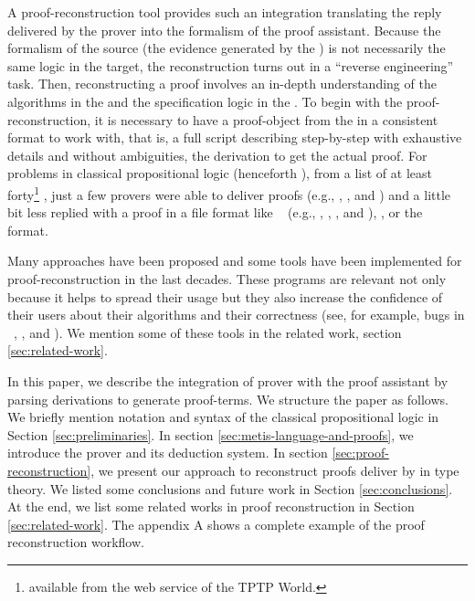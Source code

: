 \documentclass[../main.tex]{subfiles}
\begin{document}
A proof-reconstruction tool provides such an integration translating
the reply delivered by the prover into the formalism of the proof
assistant. Because the formalism of the source (the evidence
generated by the \ATP) is not necessarily the same logic in the
target, the reconstruction turns out in a ``reverse engineering''
task. Then, reconstructing a proof involves an in-depth
understanding of the algorithms in the \ATP and the specification
logic in the \ITP. To begin with the proof-reconstruction, it is
necessary to have a proof-object from the \ATP in a consistent
format to work with, that is, a full script describing step-by-step
with exhaustive details and without ambiguities, the derivation to
get the actual proof.
For problems in classical propositional logic (henceforth \CPL),
from a list of at least forty\footnote{\ATPs available from the web
service  of the TPTP World.} \ATPs, just a few
provers were able to deliver proofs (e.g., 
\cite{Barrett2011}, , and 
\cite{hillenbrand1997}) and a little bit less replied with a proof
in a file format like \TSTP~\cite{sutcliffe2004tstp} (e.g.,
, \Metis, , and ), 
\cite{Stump2008}, or the ~\cite{Bohme2011} format.

Many approaches have been proposed and some tools have been
implemented for proof-reconstruction in the last decades. These
programs are relevant not only because it helps to spread their
usage but they also increase the confidence of their users about
their algorithms and their correctness (see, for example, bugs in
\ATPs~\cite{Keller2013}, \cite{Bohme2011}, \cite{Fleury2014} and
\cite{Kanso2012}). We mention some of these tools in the related
work, section \ref{sec:related-work}.

In this paper, we describe the integration of \Metis prover with the
proof assistant \Agda by parsing \TSTP derivations to generate \Agda
proof-terms. We structure the paper as follows.
We briefly mention notation and syntax of the classical propositional
logic in Section \ref{sec:preliminaries}.
In section \ref{sec:metis-language-and-proofs}, we introduce the
\Metis prover and its deduction system.
In section \ref{sec:proof-reconstruction}, we present our
approach to reconstruct proofs deliver by \Metis in type theory.
We listed some conclusions and future work in Section
\ref{sec:conclusions}. At the end, we list some related works in
proof reconstruction in Section \ref{sec:related-work}.
The appendix \textsc{A} shows a complete example of the proof
reconstruction workflow.
\end{document}
